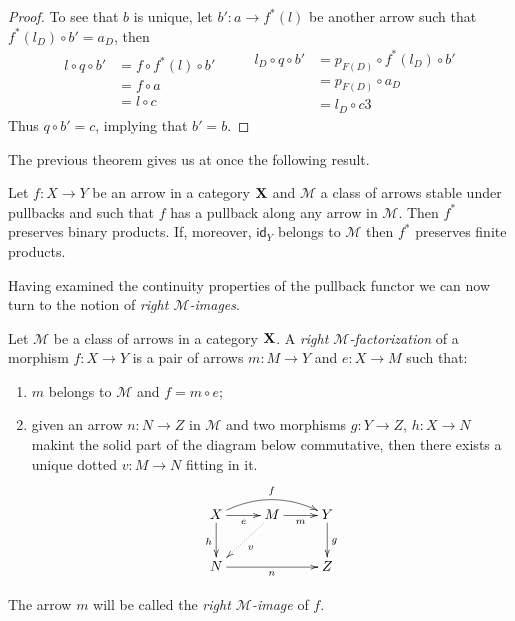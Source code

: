 \documentclass[a4paper,UKenglish,cleveref,pdftex,thm-restate,numberwithinsect]{lipics-v2021}
\newcommand{\id}[1]{\mathsf{id}_{#1}}
\def\X{\textbf {\textup{X}}}
\begin{document}
\begin{proof}
	To see that $b$ is unique, let $b'\colon a\to f^*(l)$ be another arrow such that $f^*(l_D)\circ b' =a_D$, then
	\[\begin{split}
		l\circ q \circ b'&=f\circ f^*(l)\circ b'\\&=f\circ a\\&=l\circ c
	\end{split} \qquad \begin{split}
		l_D\circ q \circ b'&=p_{F(D)}\circ f^*(l_D)\circ b'\\&=p_{F(D)}\circ a_D\\&=l_D\circ c
		3\end{split}\]
	Thus $q\circ b'=c$, implying that $b'=b$.
\end{proof}

The previous theorem gives us at once the following result.

\begin{corollary} \label{cor:finlim}
	Let $f\colon X\to Y$ be an arrow in a category $\X$ and $\mathcal{M}$ a class of arrows stable under pullbacks and such that $f$ has a pullback along any arrow in $\mathcal{M}$. Then $f^*$ preserves binary products. If, moreover, $\id{Y}$ belongs to $\mathcal{M}$ then $f^*$ preserves finite products.
\end{corollary}

Having examined the continuity properties of the pullback functor we can now turn to the notion of \emph{right $\mathcal{M}$-images}.

\begin{definition}
	Let $\mathcal{M}$ be a class of arrows in a category $\X$. A \emph{right $\mathcal{M}$-factorization
	} of a morphism $f\colon X\to Y$ is a pair of arrows $m\colon M\to Y$ and $e\colon X\to M$ such that:
	\begin{enumerate}
		\item $m$ belongs to $\mathcal{M}$ and $f=m\circ e$;
		\item given an arrow $n\colon N\to Z$ in $\mathcal{M}$ and two morphisms $g\colon Y\to Z$, $h\colon X\to N$ makint the solid part of the diagram below commutative, then there exists a unique dotted $v\colon M\to N$ fitting in it.
		\[\xymatrix{X \ar[r]_-{e} \ar@/^.4cm/[rr]^{f} \ar[d]_{h}& M \ar[r]_-{m} \ar@{.>}[dl]^{v} & Y \ar[d]^{g}\\N \ar[rr]_{n} && Z}\] 
	\end{enumerate}  
	
	The arrow $m$ will be called the \emph{right $\mathcal{M}$-image} of $f$.
\end{definition}
\end{document}
